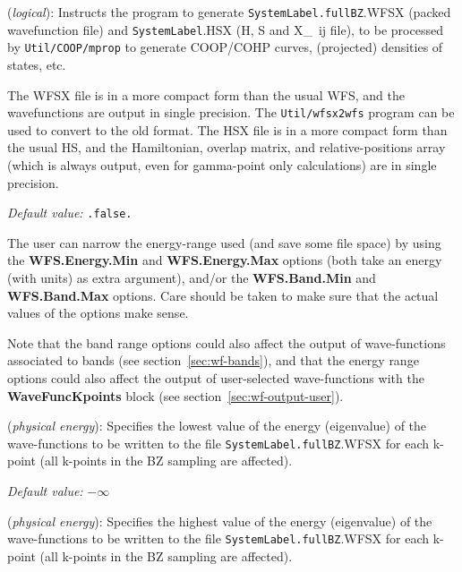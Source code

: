 \documentclass[11pt]{article}
\begin{document}
\begin{description}
\itemsep 10pt
\parsep 0pt

\item[{\bf COOP.Write}] ({\it logical}):
Instructs the program to generate  {\tt SystemLabel.fullBZ}.WFSX (packed
wavefunction file) and  {\tt SystemLabel}.HSX (H, S and X\_~{ij} file),
to be processed by {\tt Util/COOP/mprop} to generate COOP/COHP curves,
(projected) densities of states, etc.

The WFSX file is in a more compact form than the usual WFS, and the
wavefunctions are output in single precision. The {\tt Util/wfsx2wfs}
program can be used to convert to the old format.
The HSX file is in a more compact form than the usual HS, and the
Hamiltonian, overlap matrix, and relative-positions array (which is
always output, even for gamma-point only calculations) are in
single precision.

{\it Default value:} {\tt .false.}

The user can narrow the energy-range used (and save some file space)
by using the {\bf WFS.Energy.Min} and {\bf WFS.Energy.Max} options (both take an
energy (with units) as extra argument), and/or the {\bf WFS.Band.Min} and
{\bf WFS.Band.Max} options. Care should be taken to make sure that the 
actual values of the options make sense.

Note that the band range options could also affect the output of
wave-functions associated to bands (see section~\ref{sec:wf-bands}),
and that the energy range options could also affect the output of
user-selected wave-functions with the {\bf WaveFuncKpoints} block (see
section~\ref{sec:wf-output-user}).

\item[{\bf WFS.Energy.Min}] ({\it physical energy}):
Specifies the lowest value of the energy (eigenvalue) of the wave-functions to be written to 
the file {\tt SystemLabel.fullBZ}.WFSX for each k-point (all k-points
in the BZ sampling are affected). 

{\it Default value:} $-\infty$

\item[{\bf WFS.Energy.Max}] ({\it physical energy}):
Specifies the highest value of the energy (eigenvalue) of the wave-functions to be written to 
the file {\tt SystemLabel.fullBZ}.WFSX for each k-point (all k-points
in the BZ sampling are affected).


\end{description}
\end{document}
